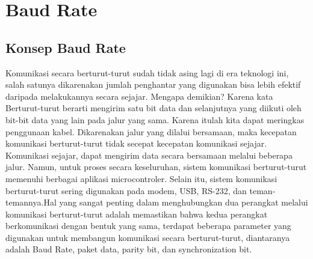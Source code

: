 
\section{Baud Rate}
\subsection{Konsep Baud Rate}
Komunikasi secara berturut-turut sudah tidak asing lagi di era teknologi ini, salah satunya dikarenakan jumlah penghantar yang digunakan bisa lebih efektif daripada melakukannya secara sejajar. Mengapa demikian? Karena kata Berturut-turut berarti mengirim satu bit data dan selanjutnya yang diikuti oleh bit-bit data yang lain pada jalur yang sama. Karena itulah kita dapat meringkas penggunaan kabel. Dikarenakan jalur yang dilalui bersamaan, maka kecepatan komunikasi berturut-turut tidak secepat kecepatan komunikasi sejajar. Komunikasi sejajar, dapat mengirim data secara bersamaan melalui beberapa jalur. Namun, untuk proses secara keseluruhan, sistem komunikasi berturut-turut memenuhi berbagai aplikasi microcontroler. Selain itu, sistem komunikasi berturut-turut sering digunakan pada modem, USB, RS-232, dan teman-temannya.Hal yang sangat penting dalam menghubungkan dua perangkat melalui komunikasi berturut-turut adalah memastikan bahwa kedua perangkat berkomunikasi dengan bentuk yang sama, terdapat beberapa parameter yang digunakan untuk membangun komunikasi secara berturut-turut, diantaranya adalah Baud Rate, paket data, parity bit, dan synchronization bit.

